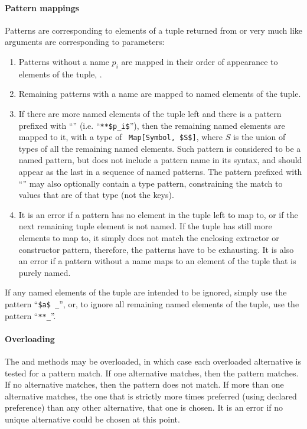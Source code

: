 \paragraph{Pattern mappings}
Patterns are corresponding to elements of a tuple returned from  or  very much like arguments are corresponding to parameters:
\begin{enumerate}
  \item Patterns without a name $p_i$ are mapped in their order of appearance to elements of the tuple, . 
  \item Remaining patterns with a name are mapped to named elements of the tuple. 
  \item If there are more named elements of the tuple left and there is a pattern prefixed with ``\code{**}'' (i.e. ``\lstinline!**$p_i$!''), then the remaining named elements are mapped to it, with a type of ~\lstinline!Map[Symbol, $S$]!, where $S$ is the union of types of all the remaining named elements. Such pattern is considered to be a named pattern, but does not include a pattern name in its syntax, and should appear as the last in a sequence of named patterns. The pattern prefixed with ``\code{**}'' may also optionally contain a type pattern, constraining the match to values that are of that type (not the keys). 
  \item It is an error if a pattern has no element in the tuple left to map to, or if the next remaining tuple element is not named. If the tuple has still more elements to map to, it simply does not match the enclosing extractor or constructor pattern, therefore, the patterns have to be exhausting. It is also an error if a pattern without a name maps to an element of the tuple that is purely named. 
\end{enumerate}
If any named elements of the tuple are intended to be ignored, simply use the pattern ``\lstinline!$a$ _!'', or, to ignore all remaining named elements of the tuple, use the pattern ``\lstinline!**_!''. 

\paragraph{Overloading}
The  and  methods may be overloaded, in which case each overloaded alternative is tested for a pattern match. If one alternative matches, then the pattern matches. If no alternative matches, then the pattern does not match. If more than one alternative matches, the one that is strictly more times preferred (using declared preference) than any other alternative, that one is chosen. It is an error if no unique alternative could be chosen at this point. 






